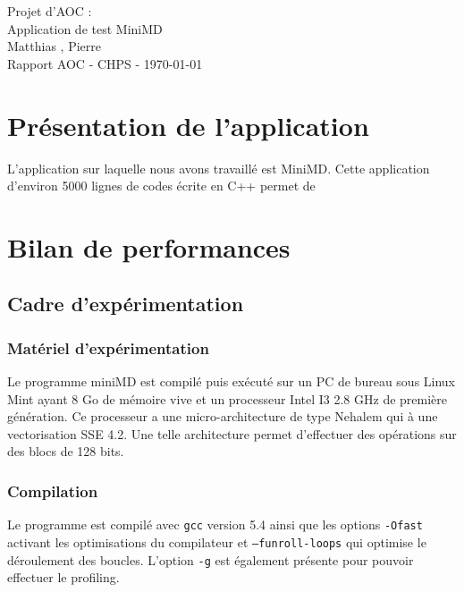 \documentclass[11pt,a4paper]{article}
\begin{document}
\begin{center}

	{\LARGE\centering Projet d'AOC :\\ Application de test MiniMD}\\[1cm]

	{ Matthias , Pierre }\\[0.5cm]
	{Rapport AOC - CHPS - \today}\\[2cm]
\end{center}

\tableofcontents
\newpage

\section{Présentation de l'application}
	L'application sur laquelle nous avons travaillé est MiniMD. Cette application d'environ 5000 lignes de codes écrite en C++ permet de 
\section{Bilan de performances}

	\subsection{Cadre d'expérimentation}
		
		\subsubsection{Matériel d'expérimentation}

			Le programme miniMD est compilé puis exécuté sur un PC de bureau sous Linux Mint ayant 8 Go de mémoire vive et un processeur Intel I3 2.8 GHz de première génération. Ce processeur a une micro-architecture de type Nehalem qui à une vectorisation SSE 4.2. Une telle architecture permet d'effectuer des opérations sur des blocs de 128 bits.

		\subsubsection{Compilation}

			Le programme est compilé avec \texttt{gcc} version 5.4 ainsi que les options \texttt{-Ofast} activant les optimisations du compilateur et \texttt{--funroll-loops} qui optimise le déroulement des boucles. L'option \texttt{-g} est également présente pour pouvoir effectuer le profiling.
\end{document}
